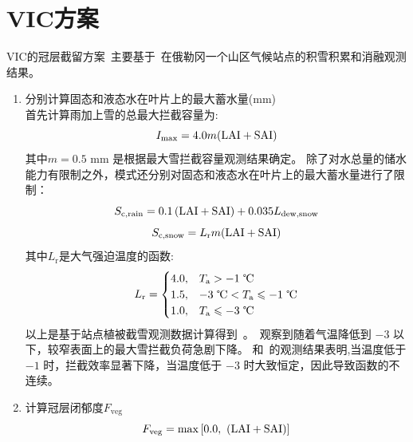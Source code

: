 \section{VIC方案}
VIC的冠层截留方案~\citep{liang1994simple,hamman2018variable}主要基于~\citet{storck2002measurement}在俄勒冈一个山区气候站点的积雪积累和消融观测结果。
\begin{enumerate}
  \item 分别计算固态和液态水在叶片上的最大蓄水量(mm)\\
    首先计算雨加上雪的总最大拦截容量为:
    \begin{equation}
      I_{\mathrm{max}} = 4.0 m ({\rm LAI}+{\rm SAI})
    \end{equation}
    其中$m=0.5$ mm 是根据最大雪拦截容量观测结果确定。
    除了对水总量的储水能力有限制之外，模式还分别对固态和液态水在叶片上的最大蓄水量进行了限制：
    \begin{equation}
      S_{\mathrm{c,rain}}=0.1\left({\rm LAI}+{\rm SAI}\right)+0.035 L_{\mathrm{dew,snow}}\\
    \end{equation}
    \begin{equation}
      S_{\mathrm{c,snow}}=L_{\mathrm {r}}  m ({\rm LAI}+{\rm SAI})
    \end{equation}
    其中$L_{\mathrm {r}} $是大气强迫温度的函数:
    \begin{equation}
      L_{\mathrm {r}}  = \begin{cases}
        4.0, & T_{\mathrm {a}}  > -1 \text{ \textcelsius}\\
        1.5, & -3 \text{ \textcelsius} < T_{\mathrm {a}}  \leqslant -1 \text{ \textcelsius}\\
        1.0, & T_{\mathrm {a}}  \leqslant -3 \text{ \textcelsius}
      \end{cases}
    \end{equation}
    以上是基于站点植被截雪观测数据计算得到~\citep{storck2002measurement}。\citet{kobayashi1987snow}~观察到随着气温降低到 $-3$ \textcelsius 以下，较窄表面上的最大雪拦截负荷急剧下降。 \citet{kobayashi1987snow}和~\citet{pfister1999snow}的观测结果表明,当温度低于 $-1$ \textcelsius 时，拦截效率显著下降，当温度低于 $-3$ \textcelsius 时大致恒定，因此导致函数的不连续。

  \item 计算冠层闭郁度$F_{\mathrm{veg}}$
    \begin{equation}
      F_{\mathrm{veg}} = \max\left[0.0,\ ({\rm LAI}+{\rm SAI})\right]
    \end{equation}


\end{enumerate}
